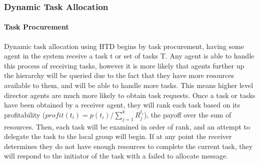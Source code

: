 \documentclass[12pt,letterpaper,onecolumn]{article}
\begin{document}
	\subsubsection{Dynamic Task Allocation}
	\paragraph{Task Procurement}
	Dynamic task allocation using HTD begins by task procurement, having some agent in the system receive a task t or set of tasks T. Any agent is able to handle this process of receiving tasks, however it is more likely that agents further up the hierarchy will be queried due to the fact that they have more resources available to them, and will be able to handle more tasks. This means higher level director agents are much more likely to obtain task requests. Once a task or tasks have been obtained by a receiver agent, they will rank each task based on its profitability ($ profit(t_{i}) = p(t_{i}) / \sum_{j=1}^{k}R^{t_{i}}_{j}$), the payoff over the sum of resources. Then, each task will be examined in order of rank, and an attempt to delegate the task to the local group will begin. If at any point the receiver determines they do not have enough resources to complete the current task, they will respond to the initiator of the task with a failed to allocate message. 
\end{document}
